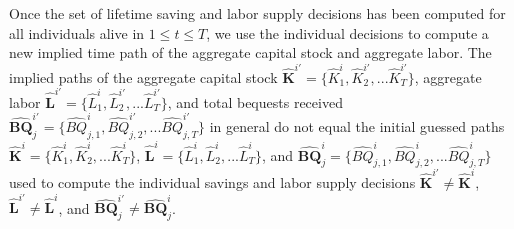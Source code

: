 \documentclass[letterpaper,12pt]{article}
\theoremstyle{definition}
\begin{document}
  Once the set of lifetime saving and labor supply decisions has been computed for all individuals alive in $1\leq t\leq T$, we use the individual decisions to compute a new implied time path of the aggregate capital stock and aggregate labor. The implied paths of the aggregate capital stock $\bm{\hat{K}}^{i'}=\{\hat{K}_1^i,\hat{K}_2^{i'},...\hat{K}_T^{i'}\}$, aggregate labor $\bm{\hat{L}}^{i'}=\{\hat{L}_1^i,\hat{L}_2^{i'},...\hat{L}_T^{i'}\}$, and total bequests received $\bm{\hat{BQ}}_j^{i'}=\{\hat{BQ}_{j,1}^i,\hat{BQ}_{j,2}^{i'},...\hat{BQ}_{j,T}^{i'}\}$ in general do not equal the initial guessed paths $\bm{\hat{K}}^{i}=\{\hat{K}_1^i,\hat{K}_2^{i},...\hat{K}_T^{i}\}$, $\bm{\hat{L}}^{i}=\{\hat{L}_1^i,\hat{L}_2^{i},...\hat{L}_T^{i}\}$, and $\bm{\hat{BQ}}_j^{i}=\{\hat{BQ}_{j,1}^i,\hat{BQ}_{j,2}^{i},...\hat{BQ}_{j,T}^{i}\}$ used to compute the individual savings and labor supply decisions $\bm{\hat{K}}^{i'}\neq\bm{\hat{K}}^i$, $\bm{\hat{L}}^{i'}\neq\bm{\hat{L}}^i$, and $\bm{\hat{BQ}}_j^{i'}\neq\bm{\hat{BQ}}_j^i$.
\end{document}
